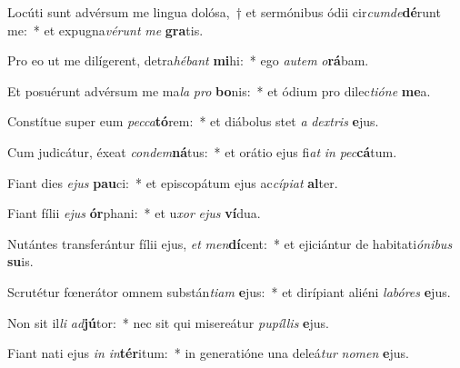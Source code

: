 \item Locúti sunt advérsum me lingua dolósa,~† et sermónibus ódii cir\textit{cum}\textit{de}\textbf{dé}runt me:~* et expugna\textit{vé}\textit{runt} \textit{me} \textbf{gra}tis.
\item Pro eo ut me dilígerent, detra\textit{hé}\textit{bant} \textbf{mi}hi:~* ego \textit{au}\textit{tem} \textit{o}\textbf{rá}bam.
\item Et posuérunt advérsum me ma\textit{la} \textit{pro} \textbf{bo}nis:~* et ódium pro dilec\textit{ti}\textit{ó}\textit{ne} \textbf{me}a.
\item Constítue super eum \textit{pec}\textit{ca}\textbf{tó}rem:~* et diábolus stet \textit{a} \textit{dex}\textit{tris} \textbf{e}jus.
\item Cum judicátur, éxeat \textit{con}\textit{dem}\textbf{ná}tus:~* et orátio ejus fi\textit{at} \textit{in} \textit{pec}\textbf{cá}tum.
\item Fiant dies \textit{e}\textit{jus} \textbf{pau}ci:~* et episcopátum ejus ac\textit{cí}\textit{pi}\textit{at} \textbf{al}ter.
\item Fiant fílii \textit{e}\textit{jus} \textbf{ór}phani:~* et u\textit{xor} \textit{e}\textit{jus} \textbf{ví}dua.
\item Nutántes transferántur fílii ejus, \textit{et} \textit{men}\textbf{dí}cent:~* et ejiciántur de habitati\textit{ó}\textit{ni}\textit{bus} \textbf{su}is.
\item Scrutétur fœnerátor omnem substán\textit{ti}\textit{am} \textbf{e}jus:~* et dirípiant aliéni \textit{la}\textit{bó}\textit{res} \textbf{e}jus.
\item Non sit il\textit{li} \textit{ad}\textbf{jú}tor:~* nec sit qui misereátur \textit{pu}\textit{píl}\textit{lis} \textbf{e}jus.
\item Fiant nati ejus \textit{in} \textit{in}\textbf{tér}itum:~* in generatióne una deleá\textit{tur} \textit{no}\textit{men} \textbf{e}jus.
